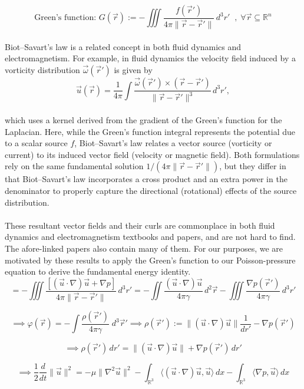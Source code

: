 \documentclass[12pt]{article}
\begin{document}
\[\text{Green's function: } G(\vec r) := - \iiint \frac{f(\vec r ')}{4\pi \|\vec r - \vec r'\|}\, d^{3} r' \;\;,\; \forall \vec r \subseteq \mathbb{R}^{n}\] \\
Biot–Savart’s law is a related concept in both fluid dynamics and electromagnetism. For example, in fluid dynamics the velocity field induced by a vorticity distribution \( \vec{\omega}(\vec r') \) is given by
\[
\vec{u}(\vec r) = \frac{1}{4\pi} \int \frac{\vec{\omega}(\vec r') \times (\vec{r}-\vec{r}')}{\|\vec{r}-\vec{r}'\|^3}\, d^3r',
\] \\ 
which uses a kernel derived from the gradient of the Green's function for the Laplacian. Here, while the Green’s function integral represents the potential due to a scalar source \(f\), Biot–Savart’s law relates a vector source (vorticity or current) to its induced vector field (velocity or magnetic field). Both formulations rely on the same fundamental solution \(1/(4\pi \|\vec r-\vec r'\|)\), but they differ in that Biot–Savart's law incorporates a cross product and an extra power in the denominator to properly capture the directional (rotational) effects of the source distribution. \\ \\ 
These resultant vector fields and their curls are commonplace in both fluid dynamics and electromagnetism textbooks and papers, and are not hard to find. The afore-linked papers also contain many of them. For our purposes, we are motivated by these results to apply the Green's function to our Poisson-pressure equation to derive the fundamental energy identity. \\

\[ = - \iiint \frac{[(\vec u \cdot \nabla) \vec u + \nabla p]}{4 \pi \|\vec r - \vec r '\|} \, d^{3} r' = - \iint \frac{(\vec u \cdot \nabla ) \vec u }{4\pi \gamma} \,d^{2} \vec r - \iiint \frac{\nabla p (\vec r')}{4\pi \gamma} \,d^{3} r'\]

\[\implies \varphi(\vec r) = -\int \frac{\rho(\vec r')}{4\pi \gamma} \;d^{3}\vec r' \implies \rho(\vec r ') := \|(\vec u \cdot \nabla) \vec u\| \frac{1}{d r'} - \nabla p(\vec r')\]

\[\implies \rho(\vec r') \,dr' = \|(\vec u \cdot \nabla)\vec u\| + \nabla p (\vec r') \,dr'\]

\[\implies \frac{1}{2}\frac{d}{dt} \|\vec u\|^{2} = -\mu \|\nabla^{2}\vec u\|^{2} - \int_{\mathbb{R}^{3}} \langle (\vec u \cdot \nabla)\vec u, \vec u\rangle \, dx - \int_{\mathbb{R}^{3}} \langle \nabla p, \vec u \rangle\, dx\]
\end{document}

